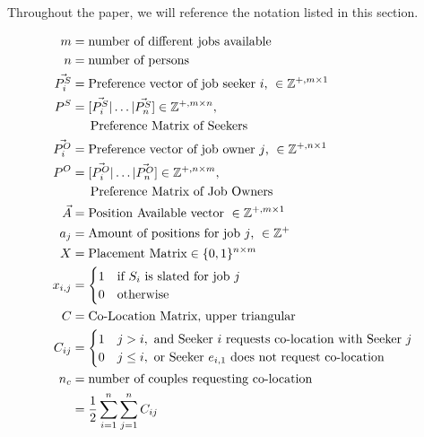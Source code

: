 
Throughout the paper, we will reference the notation listed in this section.

\begin{align}
m &= \text{number of different jobs available}\\
n &= \text{number of persons}\\
\vec{P^S_i} &= \text{Preference vector of job seeker $i$, } \in \mathbb{Z}^{+, m \times 1} \\
P^S &= [\vec{P^S_i} | \dots | \vec{P^S_n}] \in \mathbb{Z}^{+, m \times n}, \\ 
&\text{\indent Preference Matrix of Seekers} \\
\vec{P^O_i} &= \text{Preference vector of job owner $j$, } \in \mathbb{Z}^{+, n \times 1} \\
P^O &= [\vec{P^O_i} | \dots | \vec{P^O_n}] \in \mathbb{Z}^{+, n \times m}, \\ 
&\text{\indent Preference Matrix of Job Owners} \\
\vec{A} &= \text{Position Available vector }\in \mathbb{Z}^{+, m \times 1} \\
a_j &= \text{Amount of positions for job $j$, } \in \mathbb{Z}^{+} \\
X &= \text{Placement Matrix} \in \{0,1\}^{n \times m} \\
x_{i,j} &= \begin{cases}
1 & \text{if $S_i$ is slated for job $j$}\\
0 & \text{otherwise}
\end{cases} \\
C &= \text{Co-Location Matrix, upper triangular}\\
C_{ij} &= \begin{cases}
1 & j > i, \text{ and  Seeker $i$ requests co-location with Seeker $j$} \\
0 & j\leq i, \text{ or Seeker $e_{i,1}$ does not request co-location}
\end{cases} \\
n_c &= \text{number of couples requesting co-location}\\
&= \frac{1}{2}\sum_{i=1}^n\sum_{j=1}^n C_{ij}\\
\end{align}

